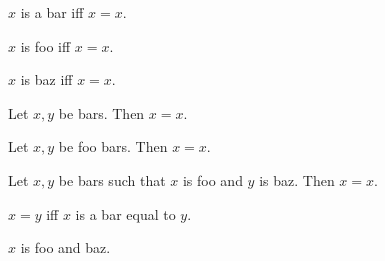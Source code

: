 \begin{definition}\label{bar}
    $x$ is a bar iff $x = x$.
\end{definition}

\begin{definition}\label{foo}
    $x$ is foo iff $x = x$.
\end{definition}

\begin{definition}\label{baz}
    $x$ is baz iff $x = x$.
\end{definition}

\begin{proposition}\label{nouns}
    Let $x, y$ be bars.
    Then $x = x$.
\end{proposition}

\begin{proposition}\label{adj_nouns}
    Let $x, y$ be foo bars.
    Then $x = x$.
\end{proposition}


\begin{proposition}\label{nouns_suchthat}
    Let $x, y$ be bars such that $x$ is foo and $y$ is baz.
    Then $x = x$.
\end{proposition}


\begin{proposition}\label{noun_verb}
    $x = y$ iff $x$ is a bar equal to $y$.
\end{proposition}


\begin{proposition}\label{adjs}
    $x$ is foo and baz.
\end{proposition}
